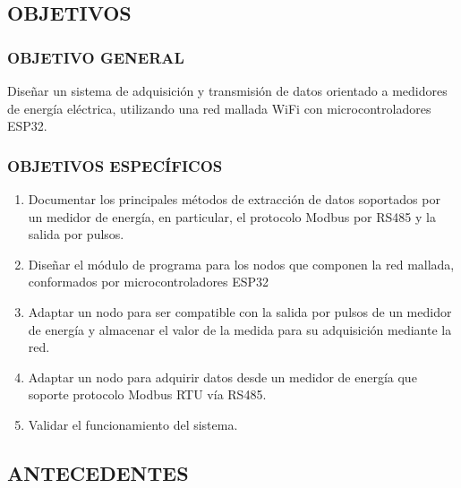 \documentclass[12pt,letterpaper]{article}
\begin{document}
\subsection*{ OBJETIVOS}
	
\vspace{0.5cm}

\subsubsection*{OBJETIVO GENERAL}

Diseñar un sistema de adquisición y transmisión de datos orientado a medidores de energía eléctrica, utilizando una red mallada WiFi con microcontroladores ESP32.

\subsubsection*{OBJETIVOS ESPECÍFICOS}


\begin{enumerate}[1.]
	
	
	
\item Documentar los principales métodos de extracción de datos soportados por un medidor de energía, en particular, el protocolo Modbus por RS485 y la salida por pulsos.

\item Diseñar el módulo de programa para los nodos que componen la red mallada, conformados por microcontroladores ESP32

\item Adaptar un nodo para ser compatible con la salida por pulsos de un medidor de energía y almacenar el valor de la medida para su adquisición mediante la red.

\item Adaptar un nodo para adquirir datos desde un medidor de energía que soporte protocolo Modbus RTU vía RS485.

\item Validar el funcionamiento del sistema.
 	

\end{enumerate}

\newpage

\begin{flushleft}
	
	\subsection*{ANTECEDENTES}

\end{flushleft}
\end{document}

